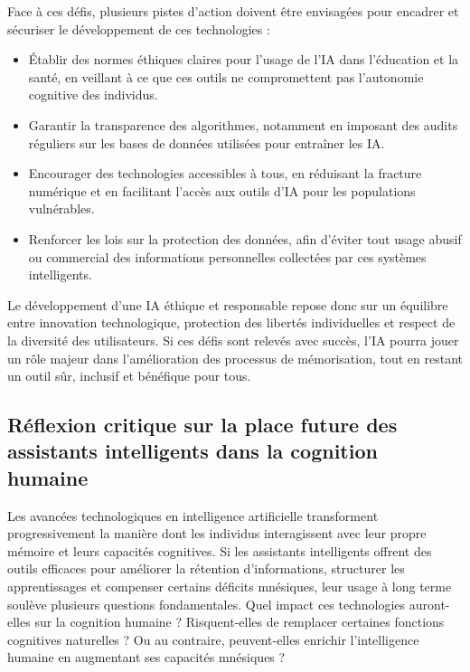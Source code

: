 \documentclass[12pt,a4paper]{report}
\begin{document}
Face à ces défis, plusieurs pistes d’action doivent être envisagées pour encadrer et sécuriser le développement de ces technologies :

\begin{itemize}

    \item Établir des normes éthiques claires pour l’usage de l’IA dans l’éducation et la santé, en veillant à ce que ces outils ne compromettent pas l’autonomie cognitive des individus.

    \item Garantir la transparence des algorithmes, notamment en imposant des audits réguliers sur les bases de données utilisées pour entraîner les IA.

    \item Encourager des technologies accessibles à tous, en réduisant la fracture numérique et en facilitant l’accès aux outils d’IA pour les populations vulnérables.

    \item Renforcer les lois sur la protection des données, afin d’éviter tout usage abusif ou commercial des informations personnelles collectées par ces systèmes intelligents.

\end{itemize}

Le développement d’une IA éthique et responsable repose donc sur un équilibre entre innovation technologique, protection des libertés individuelles et respect de la diversité des utilisateurs. Si ces défis sont relevés avec succès, l’IA pourra jouer un rôle majeur dans l’amélioration des processus de mémorisation, tout en restant un outil sûr, inclusif et bénéfique pour tous.

\subsection{Réflexion critique sur la place future des assistants intelligents dans la cognition humaine}

Les avancées technologiques en intelligence artificielle transforment progressivement la manière dont les individus interagissent avec leur propre mémoire et leurs capacités cognitives. Si les assistants intelligents offrent des outils efficaces pour améliorer la rétention d’informations, structurer les apprentissages et compenser certains déficits mnésiques, leur usage à long terme soulève plusieurs questions fondamentales. Quel impact ces technologies auront-elles sur la cognition humaine ? Risquent-elles de remplacer certaines fonctions cognitives naturelles ? Ou au contraire, peuvent-elles enrichir l’intelligence humaine en augmentant ses capacités mnésiques ?
\end{document}
